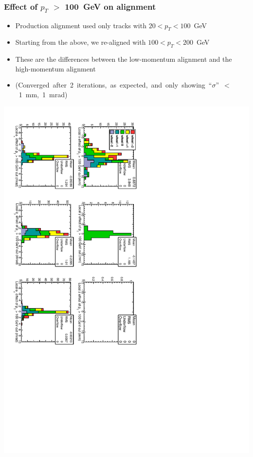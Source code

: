 \documentclass[compress]{beamer}
\begin{document}
\begin{frame}
\frametitle{Effect of $p_T$ $>$ 100~GeV on alignment}

\begin{itemize}
\item Production alignment used only tracks with \mbox{$20<p_T<100$~GeV\hspace{-2 cm}}
\item Starting from the above, we re-aligned with \mbox{$100<p_T<200$~GeV\hspace{-2 cm}}
\item These are the differences between the low-momentum alignment and the high-momentum alignment
\item \mbox{\scriptsize (Converged after 2 iterations, as expected, and only showing ``$\sigma$'' $<$ 1~mm, 1~mrad)\hspace{-1 cm}}
\end{itemize}

\includegraphics[height=\linewidth, angle=90]{data_effect_of_100GeVcut.pdf}
\end{frame}
\end{document}

